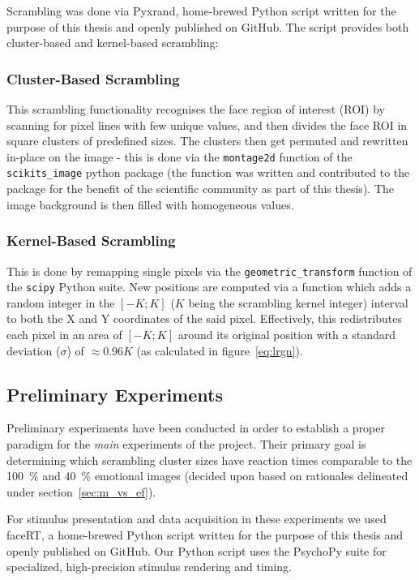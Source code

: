 	Scrambling was done via Pyxrand\cite{pyxrand}, home-brewed Python script written for the purpose of this thesis and openly published on GitHub.
	The script provides both cluster-based and kernel-based scrambling:
	    \subsubsection{Cluster-Based Scrambling}
	    This scrambling functionality recognises the face region of interest (ROI) by scanning for pixel lines with few unique values, and then divides the face ROI in square clusters of predefined sizes.
	    The clusters then get permuted and rewritten in-place on the image - this is done via the \colorbox{vlg}{\texttt{montage2d}} function of the \colorbox{vlg}{\texttt{scikits\_image}} python package 
	    (the function was written and contributed to the package for the benefit of the scientific community as part of this thesis).
	    The image background is then filled with homogeneous values.
	    \subsubsection{Kernel-Based Scrambling}\label{sec:m_vs_si_kbs}
	    This is done by remapping single pixels via the \colorbox{vlg}{\texttt{geometric\_transform}} function of the \colorbox{vlg}{\texttt{scipy}} Python suite. 
	    New positions are computed via a function which adds a random integer in the $[-K;K]$ ($K$ being the scrambling kernel integer) interval to both the X and Y coordinates of the said pixel.
	    Effectively, this redistributes each pixel in an area of $[-K;K]$ around its original position with a standard deviation ($\sigma$) of $\approx 0.96K$ (as calculated in figure~\ref{eq:lrgn}). 
	\subsection{Preliminary Experiments} 
	Preliminary experiments have been conducted in order to establish a proper paradigm for the \textit{main} experiments of the project. 
	Their primary goal is determining which scrambling cluster sizes have reaction times comparable to the \SI{100}{\percent} and \SI{40}{\percent} emotional images (decided upon based on rationales delineated under section~\ref{sec:m_vs_ef}).
	
	For stimulus presentation and data acquisition in these experiments we used faceRT\cite{faceRT}, a home-brewed Python script written for the purpose of this thesis and openly published on GitHub.
	Our Python script uses the PsychoPy suite\cite{Peirce2008} for specialized, high-precision stimulus rendering and timing.   
